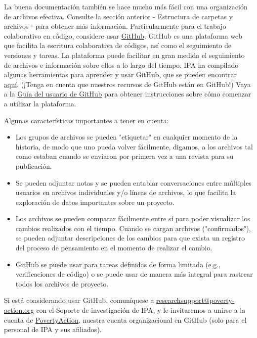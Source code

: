 \documentclass[11pt,en]{elegantpaper}
\begin{document}
La buena documentación también se hace mucho más fácil con una organización de archivos efectiva. Consulte la sección anterior - Estructura de carpetas y archivos - para obtener más información. Particularmente para el trabajo colaborativo en código, considere usar \href{https://github.com/}{GitHub}. GitHub es una plataforma web que facilita la escritura colaborativa de códigos, así como el seguimiento de versiones y tareas. La plataforma puede facilitar en gran medida el seguimiento de archivos e información sobre ellos a lo largo del tiempo. IPA ha compilado algunas herramientas para aprender y usar GitHub, que se pueden encontrar \href{https://github.com/PovertyAction/github-training}{aquí}. (¡Tenga en cuenta que nuestros recursos de GitHub están en GitHub!) Vaya a la \href{https://github.com/PovertyAction/github-training/blob/master/resources/GitHub\%20User\%20Guide.md}{Guía del usuario de GitHub} para obtener instrucciones sobre cómo comenzar a utilizar la plataforma.

Algunas características importantes a tener en cuenta:

\begin{itemize}
	\item Los grupos de archivos se pueden "etiquetar" en cualquier momento de la historia, de modo que uno pueda volver fácilmente, digamos, a los archivos tal como estaban cuando se enviaron por primera vez a una revista para su publicación.
	
	\item Se pueden adjuntar notas y se pueden entablar conversaciones entre múltiples usuarios en archivos individuales y/o líneas de archivos, lo que facilita la exploración de datos importantes sobre un proyecto.
	
	\item Los archivos se pueden comparar fácilmente entre sí para poder visualizar los cambios realizados con el tiempo. Cuando se cargan archivos ("confirmados"), se pueden adjuntar descripciones de los cambios para que exista un registro del proceso de pensamiento en el momento de realizar el cambio.
	
	\item GitHub se puede usar para tareas definidas de forma limitada (e.g., verificaciones de código) o se puede usar de manera más integral para rastrear todos los archivos de proyecto.
\end{itemize}

Si está considerando usar GitHub, comuníquese a \href{mailto:researchsupport@poverty-action.org}{researchsupport@poverty-action.org} con el Soporte de investigación de IPA, y le invitaremos a unirse a la cuenta de \href{https://github.com/PovertyAction}{PovertyAction}, nuestra cuenta organizacional en GitHub (solo para el personal de IPA y sus afiliados).
\end{document}
